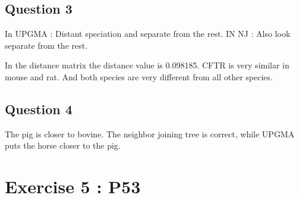 \documentclass[]{article}
\begin{document}
\newpage 

\subsection{Question 3}
In UPGMA : Distant speciation and separate from the rest.
IN NJ  : Also look separate from the rest.

In the distance matrix the distance value is 0.098185. CFTR is very similar in mouse and rat. And both species are very different from all other species.

\newpage 

\subsection{Question 4}

The pig is closer to bovine. The neighbor joining tree is correct, while UPGMA puts the horse closer to the pig.

\newpage

\section{Exercise 5 : P53}
\end{document}
